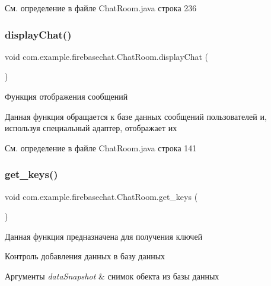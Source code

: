 См. определение в файле Chat\+Room.\+java строка 236

\mbox{\label{classcom_1_1example_1_1firebasechat_1_1_chat_room_a4523f252ff4e59d283df68e2844d8019}} 
\subsubsection{\texorpdfstring{display\+Chat()}{displayChat()}}
{\footnotesize\ttfamily void com.\+example.\+firebasechat.\+Chat\+Room.\+display\+Chat (\begin{DoxyParamCaption}{ }\end{DoxyParamCaption})}



Функция отображения сообщений 

Данная функция обращается к базе данных сообщений пользователей и, используя специальный адаптер, отображает их 

См. определение в файле Chat\+Room.\+java строка 141

\mbox{\label{classcom_1_1example_1_1firebasechat_1_1_chat_room_a581058422cc44701b83f7c2a298406a9}} 
\subsubsection{\texorpdfstring{get\+\_\+keys()}{get\_keys()}}
{\footnotesize\ttfamily void com.\+example.\+firebasechat.\+Chat\+Room.\+get\+\_\+keys (\begin{DoxyParamCaption}{ }\end{DoxyParamCaption})}



Данная функция предназначена для получения ключей 

Контроль добавления данных в базу данных 
\begin{DoxyParams}{Аргументы}
{\em data\+Snapshot} & снимок обекта из базы данных\\
\hline
\end{DoxyParams}


